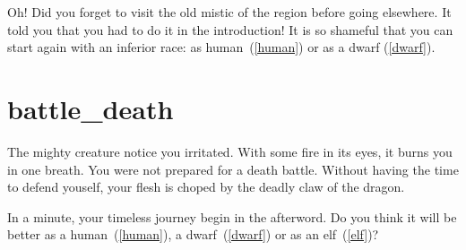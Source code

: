 Oh! Did you forget to visit the old mistic of the region before going elsewhere.
It told you that you had to do it in the introduction! It is so shameful that
you can start again with an inferior race: as human~(\ref{human}) or as a dwarf
(\ref{dwarf}).

\section{battle_death}

The mighty creature notice you irritated. With some fire in its eyes, it burns
you in one breath. You were not prepared for a death battle. Without having the
time to defend youself, your flesh is choped by the deadly claw of the dragon.

\medbreak

In a minute, your timeless journey begin in the afterword. Do you think it will
be better as a human~(\ref{human}), a dwarf~(\ref{dwarf}) or as an elf~(\ref{elf})?
